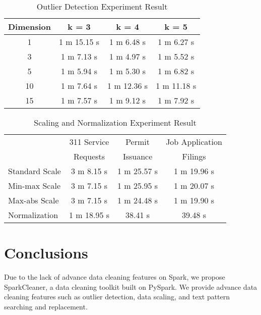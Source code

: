 \documentclass[sigconf]{acmart}
\begin{document}
\begin{table}
\caption{Outlier Detection Experiment Result}   
\label{tab:Outlier Detection Experiment Result}
\begin{tabular}{cccc}   
Dimension  &  k = 3  &  k = 4  & k = 5  \\  
\hline
1   & 1 m 15.15 s  & 1 m 6.48 s   & 1 m 6.27 s             \\ 
3   & 1 m 7.13 s    & 1 m 4.97 s   & 1 m 5.52 s             \\  
5   & 1 m 5.94 s    & 1 m 5.30 s   & 1 m 6.82 s             \\ 
10 & 1 m 7.64 s    & 1 m 12.36 s & 1 m 11.18 s           \\ 
15 & 1 m 7.57 s    & 1 m 9.12 s   & 1 m 7.92 s             \\ 

\end{tabular}   
\end{table}

\begin{table}
\caption{Scaling and Normalization Experiment Result}   
\label{tab:Scaling and Normalization Experiment Result}
\begin{tabular}{lccc}   
 	                      &  311 Service  &  Permit    &  Job Application \\ &Requests&Issuance&Filings   \\  
\hline
Standard Scale   & 3 m 8.15 s     & 1 m 25.57 s & 1 m 19.96 s            \\ 
Min-max Scale  &  3 m 7.15 s   & 1 m 25.95 s  & 1 m 20.07 s             \\  
Max-abs Scale  & 3 m 7.15 s     &  1 m 24.48 s  & 1 m 19.90 s             \\ 
Normalization    & 1 m 18.95 s     &  38.41 s & 39.48 s             \\ 

\end{tabular}   
\end{table}

\section{Conclusions}
Due to the lack of advance data cleaning features on Spark, we propose SparkCleaner, a data cleaning toolkit built on PySpark. We provide advance data cleaning features such as outlier detection, data scaling, and text pattern searching and replacement.



\end{document}
